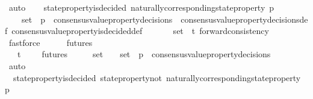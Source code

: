 \begin{isabellebody}
\ auto\isanewline
\ \ \isamarkupfalse%
\ {\isachardoublequoteopen}state{\isacharunderscore}property{\isacharunderscore}is{\isacharunderscore}decided\ {\isacharparenleft}naturally{\isacharunderscore}corresponding{\isacharunderscore}state{\isacharunderscore}property\ p{\isacharcomma}\ {\isasymsigma}{\isacharprime}{\isacharprime}{\isacharparenright}{\isachardoublequoteclose}\ \isanewline
\ \ \ \ \isamarkupfalse%
\ {\isacartoucheopen}{\isacharbraceleft}{\isasymsigma}{\isacharcomma}\ {\isasymsigma}{\isacharprime}{\isacharbraceright}\ {\isasymsubseteq}\ {\isasymsigma}{\isacharunderscore}set\ {\isasymand}\ p\ {\isasymin}\ consensus{\isacharunderscore}value{\isacharunderscore}property{\isacharunderscore}decisions\ {\isasymsigma}{\isacartoucheclose}\ consensus{\isacharunderscore}value{\isacharunderscore}property{\isacharunderscore}decisions{\isacharunderscore}def\ consensus{\isacharunderscore}value{\isacharunderscore}property{\isacharunderscore}is{\isacharunderscore}decided{\isacharunderscore}def\ \isanewline
\ \ \ \ \isamarkupfalse%
\ {\isacartoucheopen}{\isasymsigma}{\isacharunderscore}set\ {\isasymsubseteq}\ {\isasymSigma}t{\isacartoucheclose}\ forward{\isacharunderscore}consistency\ \isamarkupfalse%
\ fastforce\isanewline
\ \ \isamarkupfalse%
\ {\isachardoublequoteopen}{\isasymsigma}{\isacharprime}{\isacharprime}\ {\isasymin}\ futures\ {\isasymsigma}{\isacharprime}{\isachardoublequoteclose}\ \isanewline
\ \ \ \ \isamarkupfalse%
\ {\isacartoucheopen}{\isasymsigma}{\isacharprime}{\isacharprime}\ {\isasymin}\ {\isasymSigma}t\ {\isasymand}\ {\isasymsigma}{\isacharprime}{\isacharprime}\ {\isasymin}\ {\isasymInter}\ {\isacharbraceleft}futures\ {\isasymsigma}\ {\isacharbar}\ {\isasymsigma}{\isachardot}\ {\isasymsigma}\ {\isasymin}\ {\isasymsigma}{\isacharunderscore}set{\isacharbraceright}{\isacartoucheclose}\ {\isacartoucheopen}{\isacharbraceleft}{\isasymsigma}{\isacharcomma}\ {\isasymsigma}{\isacharprime}{\isacharbraceright}\ {\isasymsubseteq}\ {\isasymsigma}{\isacharunderscore}set\ {\isasymand}\ p\ {\isasymin}\ consensus{\isacharunderscore}value{\isacharunderscore}property{\isacharunderscore}decisions\ {\isasymsigma}{\isacartoucheclose}\isanewline
\ \ \ \ \isamarkupfalse%
\ auto\isanewline
\ \ \isamarkupfalse%
\ {\isachardoublequoteopen}{\isasymnot}\ state{\isacharunderscore}property{\isacharunderscore}is{\isacharunderscore}decided\ {\isacharparenleft}state{\isacharunderscore}property{\isacharunderscore}not\ {\isacharparenleft}naturally{\isacharunderscore}corresponding{\isacharunderscore}state{\isacharunderscore}property\ p{\isacharparenright}{\isacharcomma}\ {\isasymsigma}{\isacharprime}{\isacharparenright}{\isachardoublequoteclose}\isanewline

\end{isabellebody}
